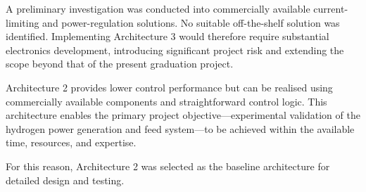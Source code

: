 A preliminary investigation was conducted into commercially available current-limiting and power-regulation solutions. No suitable off-the-shelf solution was identified. Implementing Architecture 3 would therefore require substantial electronics development, introducing significant project risk and extending the scope beyond that of the present graduation project.

Architecture 2 provides lower control performance but can be realised using commercially available components and straightforward control logic. This architecture enables the primary project objective—experimental validation of the hydrogen power generation and feed system—to be achieved within the available time, resources, and expertise.

For this reason, Architecture 2 was selected as the baseline architecture for detailed design and testing.


